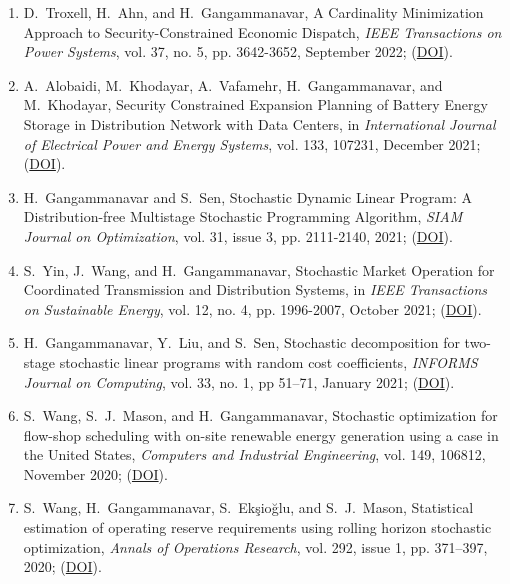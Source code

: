 \documentclass[hyperref, margin]{myResume}
\begin{document}
\begin{resume}
\begin{enumerate}[label=J\arabic*., leftmargin=*]
	\item D.\ Troxell\footnotemark[2], H.\ Ahn, and H.\ Gangammanavar, A Cardinality Minimization Approach to Security-Constrained Economic Dispatch, \textit{IEEE Transactions on Power Systems}, vol. 37, no. 5, pp. 3642-3652, September 2022; (\href{https://doi.org/10.1109/TPWRS.2021.3133379}{DOI}).

	\item A.\ Alobaidi\footnotemark[3], M.\ Khodayar, A.\ Vafamehr, H.\ Gangammanavar, and M.\ Khodayar, Security Constrained Expansion Planning of Battery Energy Storage in Distribution Network with Data Centers, in \textit{International Journal of Electrical Power and Energy Systems}, vol. 133, 107231, December 2021; (\href{https://doi.org/10.1016/j.ijepes.2021.107231}{DOI}).

	\item H.\ Gangammanavar and S.\ Sen, Stochastic Dynamic Linear Program: A Distribution-free Multistage Stochastic Programming Algorithm, \textit{SIAM Journal on Optimization}, vol. 31, issue 3, pp. 2111-2140, 2021; (\href{https://doi.org/10.1137/19M1290735}{DOI}).

	\item S.\ Yin\footnotemark[3], J.\ Wang, and H.\ Gangammanavar, Stochastic Market Operation for Coordinated Transmission and Distribution Systems, in \textit{IEEE Transactions on Sustainable Energy}, vol. 12, no. 4, pp. 1996-2007, October 2021; (\href{https://doi.org/10.1109/TSTE.2021.3076037}{DOI}).

	\item H.\ Gangammanavar, Y.\ Liu, and S.\ Sen, Stochastic decomposition for two-stage stochastic linear programs with random cost coefficients, \textit{INFORMS Journal on Computing}, vol. 33, no. 1, pp 51–71, January 2021; (\href{https://doi.org/10.1287/ijoc.2019.0929}{DOI}).

	\item S.\ Wang\footnotemark[3], S.\ J.\ Mason, and H.\ Gangammanavar, Stochastic optimization for flow-shop scheduling with on-site renewable energy generation using a case in the United States, \textit{Computers and Industrial Engineering}, vol. 149, 106812, November 2020; (\href{https://doi.org/10.1016/j.cie.2020.106812}{DOI}).

	\item S.\ Wang\footnotemark[3], H.\ Gangammanavar, S.\ Ek{\c{s}}io{\u{g}}lu, and S.\ J.\ Mason, Statistical estimation of operating reserve requirements using rolling horizon stochastic optimization, \textit{Annals of Operations Research}, vol. 292, issue 1, pp. 371–397, 2020; (\href{https://doi.org/10.1007/s10479-019-03482-x}{DOI}).


\end{enumerate}
\end{resume}
\end{document}
